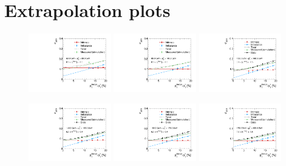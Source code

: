 \section{Extrapolation plots}
\label{res:app:extrapolationPlots}
\begin{figure}[ht]
 \centering
    \includegraphics[width=0.32\textwidth]{figures/resolution/results/JER_for_1_eta_bin_3_pTGamma_bin_all_contributions_PFCHS_RMS99_mc.pdf}
    \includegraphics[width=0.32\textwidth]{figures/resolution/results/JER_for_1_eta_bin_4_pTGamma_bin_all_contributions_PFCHS_RMS99_mc.pdf}
    \includegraphics[width=0.32\textwidth]{figures/resolution/results/JER_for_1_eta_bin_5_pTGamma_bin_all_contributions_PFCHS_RMS99_mc.pdf}

    \includegraphics[width=0.32\textwidth]{figures/resolution/results/JER_for_1_eta_bin_6_pTGamma_bin_all_contributions_PFCHS_RMS99_mc.pdf}
    \includegraphics[width=0.32\textwidth]{figures/resolution/results/JER_for_1_eta_bin_7_pTGamma_bin_all_contributions_PFCHS_RMS99_mc.pdf}
    \includegraphics[width=0.32\textwidth]{figures/resolution/results/JER_for_1_eta_bin_8_pTGamma_bin_all_contributions_PFCHS_RMS99_mc.pdf}


\end{figure}
